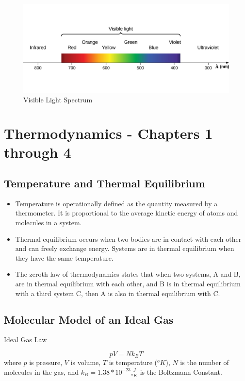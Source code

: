 \documentclass[14pt]{memoir}
\begin{document}
\begin{figure}[H]
\begin{center}
\includegraphics[scale=0.5]{fig/fig_16_20.jpg}
\caption{Visible Light Spectrum}
\label{fig:16_20}
\end{center}
\end{figure}

\chapter{Thermodynamics - Chapters 1 through 4}

\section{Temperature and Thermal Equilibrium}

\begin{itemize}
\item Temperature is operationally defined as the quantity measured by a thermometer. It is proportional to the average kinetic energy of atoms and molecules in a system.
\item Thermal equilibrium occurs when two bodies are in contact with each other and can freely exchange energy. Systems are in thermal equilibrium when they have the same temperature.
\item The zeroth law of thermodynamics states that when two systems, A and B, are in thermal equilibrium with each other, and B is in thermal equilibrium with a third system C, then A is also in thermal equilibrium with C.
\end{itemize}

\section{Molecular Model of an Ideal Gas}

Ideal Gas Law

\begin{equation}
pV = N k_B T
\end{equation}
where $p$ is pressure, $V$ is volume, $T$ is temperature ($^o K$), $N$ is the number of molecules in the gas, and $k_B = 1.38 * 10^{-23} \frac{J}{^o K}$ is the Boltzmann Constant. 
\end{document}
